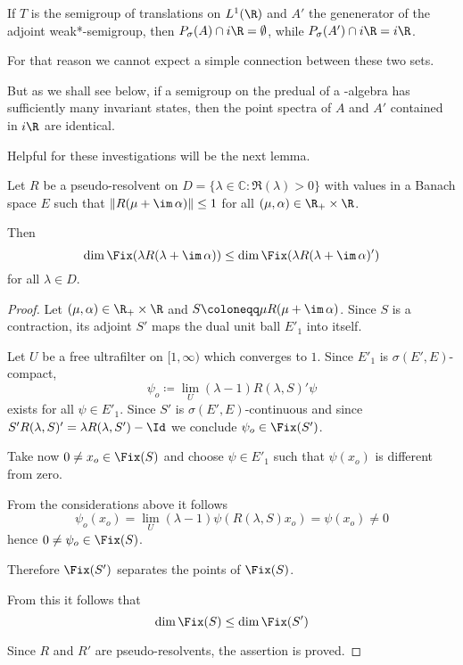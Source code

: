 
If $T$ is the semigroup of translations on $L^1(\R)$ and $A'$ the genenerator 
of the adjoint weak*-semigroup, then $P_{\sigma}(A) \cap i\R = \emptyset$, while $P_{\sigma}(A') \cap i\R = i\R$.

For that reason we cannot expect a simple connection between these two sets.

But as we shall see below, if a semigroup on the predual of a \WA-algebra has sufficiently many invariant states, then the point spectra of $A$ and $A'$ contained in $i\R$ are identical.

Helpful for these investigations will be the next lemma.

\begin{lemma}\label{lem:d3-1.6}
Let $R$ be a pseudo-resolvent on $D = \{\lambda \in \mathbb{C} \colon \Re(\lambda) > 0\}$ with values in a Banach space $E$ such that $\|R(\mu + \im\,\alpha)\| \leq 1$ for all $(\mu,\alpha) \in \R_{+} \times \R$.

Then
\[
\dim \Fix(\lambda R(\lambda + \im\,\alpha)) \leq \dim \Fix(\lambda R(\lambda + \im\,\alpha)')
\]
for all $\lambda \in D$.
\end{lemma}

\begin{proof}
Let $(\mu,\alpha) \in \R_{+} \times \R$ and $S \coloneqq \mu R(\mu + \im\,\alpha)$.
Since $S$ is a contraction, its adjoint $S'$ maps the dual unit ball $E'_{1}$ into itself.

Let $U$ be a free ultrafilter on $[1,\infty)$ which converges to $1$.
Since $E'_{1}$ is $\sigma(E',E)$-compact,
\[
\psi_{o} \coloneqq \lim_{U}(\lambda - 1)R(\lambda,S)'\psi
\]
exists for all $\psi \in E'_{1}$.
Since $S'$ is $\sigma(E',E)$-continuous and since $S'R(\lambda,S)' = \lambda R(\lambda,S')-\Id$ we conclude $\psi_{o} \in \Fix(S')$.

Take now $0 \neq x_{o} \in \Fix(S)$ and choose $\psi \in E'_{1}$ such that $\psi(x_{o})$ is different from zero.

From the considerations above it follows
\[
\psi_{o}(x_{o}) = \lim_{U}(\lambda - 1)\psi(R(\lambda,S)x_{o}) = \psi(x_{o}) \neq 0
\]
hence $0 \neq \psi_{o} \in \Fix(S)$.

Therefore $\Fix(S')$ separates the points of $\Fix(S)$.

From this it follows that
\[
\dim \Fix(S) \leq \dim \Fix(S')
\]

Since $R$ and $R'$ are pseudo-resolvents, the assertion is proved.
\end{proof}

